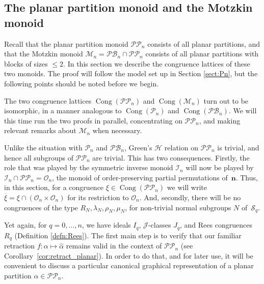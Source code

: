\documentclass[11pt,a4paper]{article}
\newcommand{\PP}{\mathscr{P}\P}
\newcommand{\M}{\mathcal M}
\renewcommand{\O}{\mathcal O}
\newcommand{\I}{\mathcal I}
\renewcommand{\S}{\mathcal S}
\renewcommand{\P}{\mathcal P}
\newcommand{\PB}{\mathcal{PB}}
\renewcommand{\H}{\mathrel{\mathscr H}}
\newcommand{\gJ}{\mathrel{\mathscr J}}
\newcommand{\bn}{\mathbf{n}}
\newcommand{\al}{\alpha}
\newcommand{\Cong}{\operatorname{Cong}}
\newcommand{\1}{\id_n}
\numberwithin{equation}{section}
\theoremstyle{definition}
\begin{document}
\begin{itemize}
\begin{itemize}
\section{The planar partition monoid \boldmath{$\PP_n$} and the Motzkin monoid \boldmath{$\M_n$}}
\label{sect:PPnMn}

Recall that the planar partition monoid $\PP_n$ consists of all planar partitions,
and that the Motzkin monoid $\M_n=\PB_n\cap \PP_n$ consists of all planar partitions with blocks of sizes $\leq 2$.
In this section we describe the congruence lattices of these two monoids. The proof will follow
the model set up in Section \ref{sect:Pn}, but the following points should be noted before we begin.

The two congruence lattices $\Cong(\PP_n)$ and $\Cong(\M_n)$ turn out to be isomorphic, in a manner analogous to $\Cong(\P_n)$ and $\Cong(\PB_n)$. We will this time run the two proofs in parallel, concentrating on $\PP_n$, and making relevant remarks about $\M_n$ when necessary.

Unlike the situation with $\P_n$ and $\PB_n$, Green's $\H$ relation on $\PP_n$ is trivial, and hence all subgroups of $\PP_n$ are trivial. This has two consequences. Firstly, the role that was played by the symmetric inverse monoid $\I_n$
will now be played by $\I_n\cap \PP_n=\O_n$, the monoid of order-preserving partial permutations of~$\bn$. 
Thus, in this section, for a congruence $\xi\in\Cong(\PP_n)$ we will write $\overline{\xi}=\xi\cap(\O_n\times\O_n)$ for its restriction to $\O_n$.
And, secondly, there will be no congruences of the type $R_N,\lambda_N,\rho_N,\mu_N$, for non-trivial normal subgroups $N$ of~$\S_q$.

Yet again, for $q=0,\dots,n$, we have ideals $I_q$, $\gJ$-classes $J_q$, and Rees congruences $R_q$ (Definition \ref{defn:Rees}).
The first main step is to verify that our familiar retraction $f:\alpha\mapsto\widehat{\alpha}$ remains valid in the context of $\PP_n$ (see Corollary~\ref{cor:retract_planar}).  In order to do that, and for later use, it will be convenient to discuss a particular canonical graphical representation of a planar partition $\al\in\PP_n$.


\end{itemize}
\end{itemize}
\end{document}
